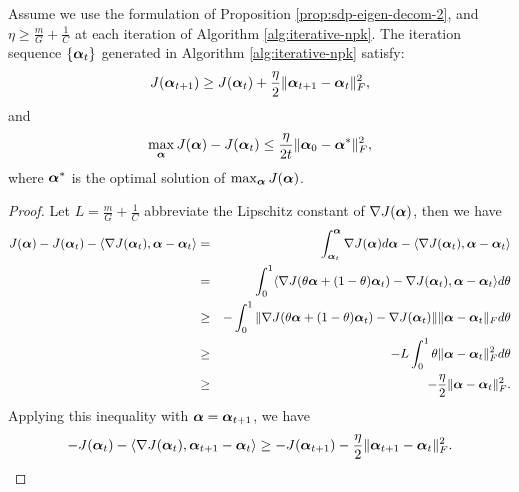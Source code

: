\begin{prop}\label{prop:convergence}
Assume we use the formulation of Proposition \ref{prop:sdp-eigen-decom-2}, and
$\eta \geq \frac{m}{G} + \frac{1}{C}$ at each iteration of Algorithm
\ref{alg:iterative-npk}. The iteration sequence $\{\ba_t\}$ generated in Algorithm
\ref{alg:iterative-npk} satisfy:
\[
\J(\ba_{t+1}) \geq \J(\ba_t) + \frac{\eta}{2}\| \ba_{t+1} - \ba_t \|^2_F,
\]
and
\[
\max_\ba \J(\ba) - \J(\ba_t) \leq \frac{\eta}{2t} \| \ba_0 - \ba^* \|^2_F,
\]
where $\ba^*$ is the optimal solution of $\max_\ba \J(\ba)$.
\end{prop}

\begin{proof}
Let $L = \frac{m}{G} + \frac{1}{C}$ abbreviate the Lipschitz constant of
$\nabla\J(\ba)$, then we have
\begin{eqnarray}
\J(\ba) - \J(\ba_t) - \langle \nabla\J(\ba_t), \ba - \ba_t \rangle &=& \int_{\ba_t}^\ba \nabla\J(\ba)d\ba - \langle \nabla\J(\ba_t), \ba - \ba_t \rangle \nonumber\\
&=& \int_0^1 \langle \nabla\J(\theta\ba + (1 - \theta) \ba_t) - \nabla\J(\ba_t), \ba - \ba_t \rangle d\theta \nonumber\\
&\geq& -\int_0^1\| \nabla\J(\theta\ba + (1 - \theta) \ba_t) - \nabla\J(\ba_t) \| \|\ba - \ba_t\|_F d\theta \nonumber\\
&\geq& - L\int_0^1 \theta\| \ba - \ba_t \|^2_F d\theta  \nonumber\\
&\geq& -\frac{\eta}{2}\| \ba - \ba_t\|^2_F \nonumber .
\end{eqnarray}
Applying this inequality with $\ba = \ba_{t+1}$, we have
\begin{equation}
-\J(\ba_t) - \langle \nabla\J(\ba_t), \ba_{t+1} - \ba_t \rangle \geq -\J(\ba_{t+1}) - \frac{\eta}{2}\| \ba_{t+1} - \ba_t \|^2_F. \label{eqn:inq1}
\end{equation}


\end{proof}
